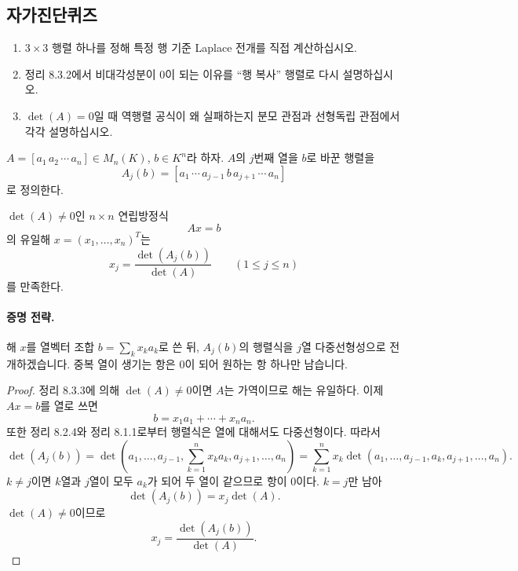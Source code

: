 \subsection*{자가진단퀴즈}
\begin{enumerate}[label=\arabic*.]
\item $3\times3$ 행렬 하나를 정해 특정 행 기준 Laplace 전개를 직접 계산하십시오.
\item 정리 8.3.2에서 비대각성분이 0이 되는 이유를 ``행 복사'' 행렬로 다시 설명하십시오.
\item $\det(A)=0$일 때 역행렬 공식이 왜 실패하는지 분모 관점과 선형독립 관점에서 각각 설명하십시오.
\end{enumerate}


\begin{definition}
$A=[a_1\,a_2\,\cdots\,a_n]\in M_n(K)$, $b\in K^n$라 하자. $A$의 $j$번째 열을 $b$로 바꾼 행렬을
$$
A_j(b)=[a_1\,\cdots\,a_{j-1}\,b\,a_{j+1}\,\cdots\,a_n]
$$
로 정의한다.
\end{definition}

\begin{theorem}[Cramer 공식]
$\det(A)\ne0$인 $n\times n$ 연립방정식
$$
Ax=b
$$
의 유일해 $x=(x_1,\dots,x_n)^T$는
$$
x_j=\frac{\det(A_j(b))}{\det(A)}\qquad(1\le j\le n)
$$
를 만족한다.
\end{theorem}

\paragraph{증명 전략.}
해 $x$를 열벡터 조합 $b=\sum_k x_k a_k$로 쓴 뒤, $A_j(b)$의 행렬식을 $j$열 다중선형성으로 전개하겠습니다. 중복 열이 생기는 항은 0이 되어 원하는 항 하나만 남습니다.

\begin{proof}
정리 8.3.3에 의해 $\det(A)\ne0$이면 $A$는 가역이므로 해는 유일하다. 이제 $Ax=b$를 열로 쓰면
$$
b=x_1a_1+\cdots+x_na_n.
$$
또한 정리 8.2.4와 정리 8.1.1로부터 행렬식은 열에 대해서도 다중선형이다. 따라서
$$
\det(A_j(b))
=\det(a_1,\dots,a_{j-1},\sum_{k=1}^n x_ka_k,a_{j+1},\dots,a_n)
=\sum_{k=1}^n x_k\det(a_1,\dots,a_{j-1},a_k,a_{j+1},\dots,a_n).
$$
$k\ne j$이면 $k$열과 $j$열이 모두 $a_k$가 되어 두 열이 같으므로 항이 0이다. $k=j$만 남아
$$
\det(A_j(b))=x_j\det(A).
$$
$\det(A)\ne0$이므로
$$
x_j=\frac{\det(A_j(b))}{\det(A)}.
$$
\end{proof}

